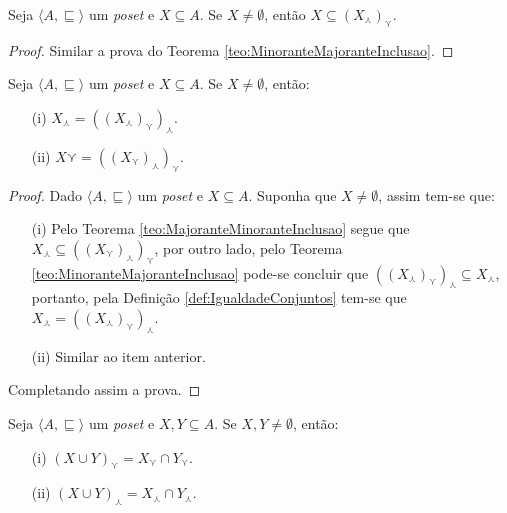 \begin{theorem}\label{teo:MajoranteMinoranteInclusao}
	Seja $\langle A, \sqsubseteq \rangle$ um \textit{poset} e $X \subseteq A$. Se $X \neq \emptyset$, então $X \subseteq (X_\curlywedge)_\curlyvee$.
\end{theorem}

\begin{proof}
	Similar a prova do Teorema \ref{teo:MinoranteMajoranteInclusao}.
\end{proof}

\begin{theorem}\label{teo:IdadeMajoranteMinorante}
	Seja $\langle A, \sqsubseteq \rangle$ um \textit{poset} e $X \subseteq A$. Se $X \neq \emptyset$, então:
	\begin{itemize}
		\item[(i)]  $X_\curlywedge = ((X_\curlywedge)_\curlyvee)_\curlywedge$.
		\item[(ii)] $X\curlyvee = ((X_\curlyvee)_\curlywedge)_\curlyvee$.
	\end{itemize}
\end{theorem}

\begin{proof}
	Dado $\langle A, \sqsubseteq \rangle$ um \textit{poset} e $X \subseteq A$. Suponha que $X \neq \emptyset$, assim tem-se que:
	\begin{itemize}
		\item[(i)] Pelo Teorema \ref{teo:MajoranteMinoranteInclusao} segue que $X_\curlywedge \subseteq ((X_\curlyvee)_\curlywedge)_\curlyvee$, por outro lado, pelo Teorema \ref{teo:MinoranteMajoranteInclusao} pode-se concluir que $((X_\curlywedge)_\curlyvee)_\curlywedge \subseteq X_\curlywedge$, portanto, pela Definição \ref{def:IgualdadeConjuntos} tem-se que  $X_\curlywedge = ((X_\curlywedge)_\curlyvee)_\curlywedge$.
		\item[(ii)] Similar ao item anterior.
	\end{itemize}
	Completando assim a prova.
\end{proof}

\begin{theorem}\label{teo:RotacaoMajoranteMinorante}
	Seja $\langle A, \sqsubseteq \rangle$ um \textit{poset} e $X, Y \subseteq A$. Se $X, Y \neq \emptyset$, então:
	\begin{itemize}
		\item[(i)]  $(X \cup Y)_\curlyvee = X_\curlyvee \cap Y_\curlyvee$.
		\item[(ii)] $(X \cup Y)_\curlywedge = X_\curlywedge \cap Y_\curlywedge$.
	\end{itemize}
\end{theorem}

